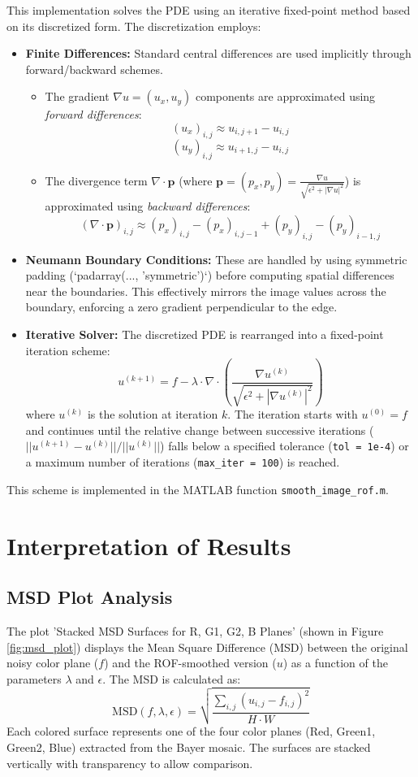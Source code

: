 \documentclass{article}
\begin{document}
	This implementation solves the PDE using an iterative fixed-point method based on its discretized form. The discretization employs:
	\begin{itemize}
		\item \textbf{Finite Differences:} Standard central differences are used implicitly through forward/backward schemes.
		\begin{itemize}
			\item The gradient $\nabla u = (u_x, u_y)$ components are approximated using \textit{forward differences}:
			$$ (u_x)_{i,j} \approx u_{i,j+1} - u_{i,j} $$
			$$ (u_y)_{i,j} \approx u_{i+1,j} - u_{i,j} $$
			\item The divergence term $\nabla \cdot \mathbf{p}$ (where $\mathbf{p} = (p_x, p_y) = \frac{\nabla u}{\sqrt{\epsilon^2 + |\nabla u|^2}}$) is approximated using \textit{backward differences}:
			$$ (\nabla \cdot \mathbf{p})_{i,j} \approx (p_x)_{i,j} - (p_x)_{i,j-1} + (p_y)_{i,j} - (p_y)_{i-1,j} $$
		\end{itemize}
		\item \textbf{Neumann Boundary Conditions:} These are handled by using symmetric padding (`padarray(..., 'symmetric')`) before computing spatial differences near the boundaries. This effectively mirrors the image values across the boundary, enforcing a zero gradient perpendicular to the edge.
		\item \textbf{Iterative Solver:} The discretized PDE is rearranged into a fixed-point iteration scheme:
		$$ u^{(k+1)} = f - \lambda \cdot \nabla \cdot \left( \frac{\nabla u^{(k)}}{\sqrt{\epsilon^2 + |\nabla u^{(k)}|^2}} \right) $$
		where $u^{(k)}$ is the solution at iteration $k$. The iteration starts with $u^{(0)} = f$ and continues until the relative change between successive iterations ($||u^{(k+1)} - u^{(k)}|| / ||u^{(k)}||$) falls below a specified tolerance (\texttt{tol = 1e-4}) or a maximum number of iterations (\texttt{max\_iter = 100}) is reached.
	\end{itemize}
	This scheme is implemented in the MATLAB function \texttt{smooth\_image\_rof.m}.
	
	\section{Interpretation of Results}
	
	\subsection{MSD Plot Analysis}
	The plot 'Stacked MSD Surfaces for R, G1, G2, B Planes' (shown in Figure \ref{fig:msd_plot}) displays the Mean Square Difference (MSD) between the original noisy color plane ($f$) and the ROF-smoothed version ($u$) as a function of the parameters $\lambda$ and $\epsilon$. The MSD is calculated as:
	$$ \text{MSD}(f,\lambda,\epsilon) = \sqrt{\frac{\sum_{i,j}(u_{i,j} - f_{i,j})^{2}}{H \cdot W}} $$
	Each colored surface represents one of the four color planes (Red, Green1, Green2, Blue) extracted from the Bayer mosaic. The surfaces are stacked vertically with transparency to allow comparison.
	
\end{document}
